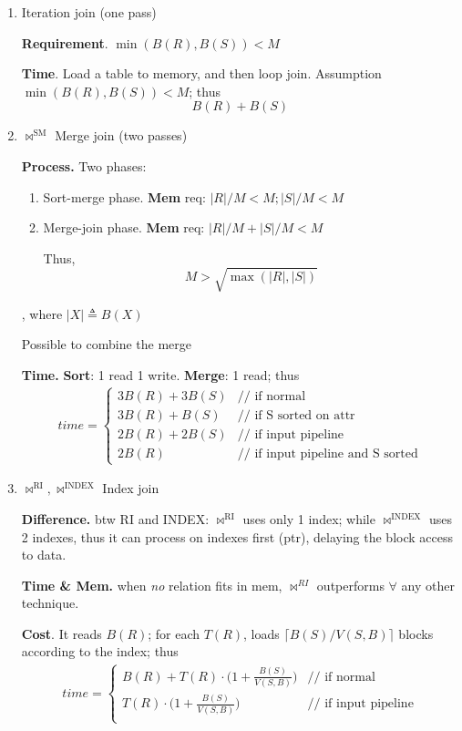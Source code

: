 \documentclass[a4paper]{report}
\begin{document}
\begin{enumerate}
\item Iteration join (one pass)

\textbf{Requirement}. $\min(B(R), B(S)) < M$

\textbf{Time}. Load a table to memory, and then loop join. Assumption $\min(B(R), B(S))<M$; thus
$$B(R)+B(S)$$
\item $\bowtie^\text{SM}$ Merge join (two passes)

\textbf{Process.} Two phases:
\begin{enumerate}
\item Sort-merge phase. \textbf{Mem} req: $|R|/M<M; |S|/M<M $
\item Merge-join phase. \textbf{Mem} req: $|R|/M+|S|/M <M$

Thus,
$$
M>\sqrt{\max{(|R|,|S|)}}
$$
\end{enumerate}

, where $|X|\triangleq B(X)$

Possible to combine the merge 

\textbf{Time.} \textbf{Sort}: 1 read 1 write. \textbf{Merge}: 1 read; thus 
\begin{eqnarray*}
time = \left\{ \begin{array}{rl}
  3B(R)+3B(S) &\text{// if normal} \\
  3B(R)+B(S) &\text{// if S sorted on attr} \\
  2B(R)+2B(S) &\text{// if input pipeline}\\
  2B(R) &\text{// if input pipeline and S sorted}
       \end{array} \right.
\end{eqnarray*}
\item $\bowtie^\text{RI}, \bowtie^\text{INDEX}$ Index join 

\textbf{Difference.} btw RI and INDEX: $\bowtie^\text{RI}$ uses only 1 index; while $\bowtie^\text{INDEX}$ uses 2 indexes, thus it can process on indexes first (ptr), delaying the block access to data. 

\textbf{Time \& Mem.} when \textit{no} relation fits in mem, $\bowtie^{RI}$ outperforms $\forall$ any other technique. 

\textbf{Cost}. It reads $B(R)$; for each $T(R)$, loads $\lceil B(S)/V(S, B)\rceil$ blocks according to the index; thus 
\begin{eqnarray*}
time = \left\{ \begin{array}{rl}
  B(R)+T(R)\cdot \big(1+\frac{B(S)}{V(S, B)}\big) &\text{// if normal} \\
  T(R)\cdot \big(1+\frac{B(S)}{V(S, B)}\big) &\text{// if input pipeline}\\
       \end{array} \right.
\end{eqnarray*}


\end{enumerate}
\end{document}

